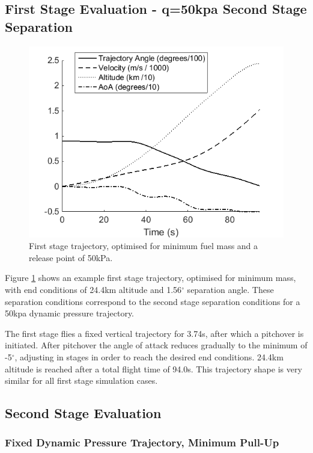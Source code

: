 \documentclass[]{aiaa-tc}
\begin{document}
\subsection{First Stage Evaluation - q=50kpa Second Stage Separation}
\begin{figure}[!ht]
	\centering
	\includegraphics[width=.7\linewidth]{FirstStage}
	\caption{First stage trajectory, optimised for minimum fuel mass and a release point of 50kPa.}
	\label{fig:FirstStage}
\end{figure}
Figure \ref{fig:FirstStage} shows an example first stage trajectory, optimised for minimum mass, with end conditions of 24.4km altitude and 1.56$^\circ$ separation angle. These separation conditions correspond to the second stage separation conditions for a 50kpa dynamic pressure trajectory. 

The first stage flies a fixed vertical trajectory for 3.74s, after which a pitchover is initiated. 
After pitchover the angle of attack reduces gradually to the minimum of -5$^\circ$, adjusting in stages in order to reach the desired end conditions. 
 24.4km altitude is reached after a total flight time of 94.0s. 
This trajectory shape is very similar for all first stage simulation cases. 



\subsection{Second Stage Evaluation}
\subsubsection{Fixed Dynamic Pressure Trajectory, Minimum Pull-Up} \label{subsection:Fixed}
\end{document}
